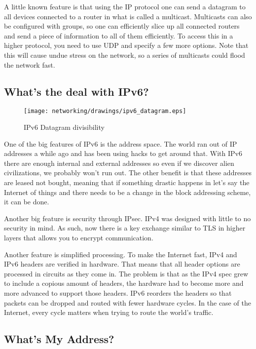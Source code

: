 A little known feature is that using the IP protocol one can send a datagram to all devices connected to a router in what is called a multicast.
Multicasts can also be configured with groups, so one can efficiently slice up all connected routers and send a piece of information to all of them efficiently.
To access this in a higher protocol, you need to use UDP and specify a few more options.
Note that this will cause undue stress on the network, so a series of multicasts could flood the network fast.

\subsection{What's the deal with IPv6?}

\begin{figure}[H]
  \centering
\texttt{[image: networking/drawings/ipv6\_datagram.eps]}
\caption{IPv6 Datagram divisibility}
\end{figure}

One of the big features of IPv6 is the address space.
The world ran out of IP addresses a while ago and has been using hacks to get around that.
With IPv6 there are enough internal and external addresses so even if we discover alien civilizations, we probably won't run out.
The other benefit is that these addresses are leased not bought, meaning that if something drastic happens in let's say the Internet of things and there needs to be a change in the block addressing scheme, it can be done.

Another big feature is security through IPsec.
IPv4 was designed with little to no security in mind.
As such, now there is a key exchange similar to TLS in higher layers that allows you to encrypt communication.

Another feature is simplified processing.
To make the Internet fast, IPv4 and IPv6 headers are verified in hardware.
That means that all header options are processed in circuits as they come in.
The problem is that as the IPv4 spec grew to include a copious amount of headers, the hardware had to become more and more advanced to support those headers.
IPv6 reorders the headers so that packets can be dropped and routed with fewer hardware cycles.
In the case of the Internet, every cycle matters when trying to route the world's traffic.

\subsection{What's My Address?}

